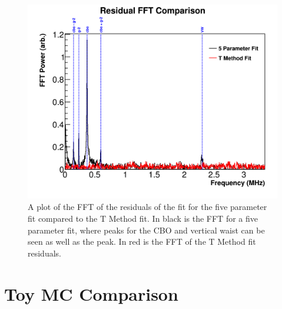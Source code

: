 	\begin{figure}[]
		\centering
		\includegraphics[width=\textwidth]{FFTComparison_TMethod}
	    \caption[FFTComparison_TMethod]{A plot of the FFT of the residuals of the fit for the five parameter fit compared to the T Method fit. In black is the FFT for a five parameter fit, where peaks for the CBO and vertical waist can be seen as well as the \gmtwo peak. In red is the FFT of the T Method fit residuals.}
	    \label{fig:FFTComparison_TMethod}
	\end{figure}






\section{Toy MC Comparison}


